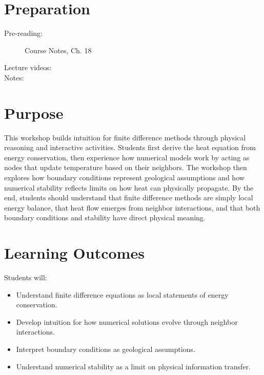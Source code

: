
\workshopstart

\vspace{-0.75em}
\section*{Preparation}

\begin{description}
  \item[Pre-reading:] Course Notes, Ch. 18
  \item[Lecture videos:]
  \item[Notes:]
\end{description}

\section*{Purpose}

This workshop builds intuition for finite difference methods through physical reasoning and interactive activities. Students first derive the heat equation from energy conservation, then experience how numerical models work by acting as nodes that update temperature based on their neighbors.  The workshop then explores how boundary conditions represent geological assumptions and how numerical stability reflects limits on how heat can physically propagate.  By the end, students should understand that finite difference methods are simply local energy balance, that heat flow emerges from neighbor interactions, and that both boundary conditions and stability have direct physical meaning.

\section*{Learning Outcomes}
Students will:
\begin{itemize}
    \item Understand finite difference equations as local statements of energy conservation.
    \item Develop intuition for how numerical solutions evolve through neighbor interactions.
    \item Interpret boundary conditions as geological assumptions.
    \item Understand numerical stability as a limit on physical information transfer.
\end{itemize}

